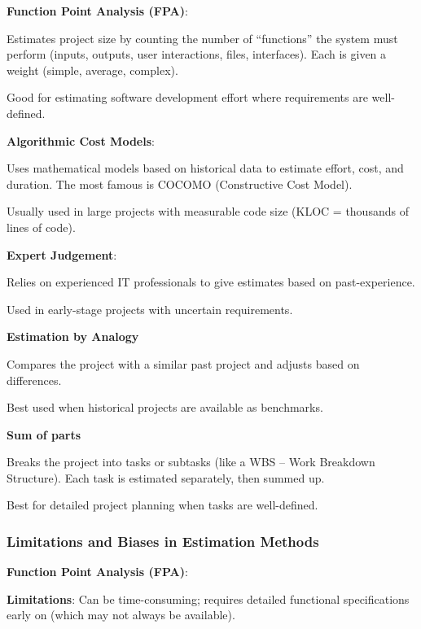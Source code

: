 \indent 

\noindent\textbf{Function Point Analysis (FPA)}:

Estimates project size by counting the number of “functions” the system must perform (inputs, outputs, user interactions, files, interfaces). Each is given a weight (simple, average, complex).

Good for estimating software development effort where requirements are well-defined.

\bigskip

\noindent\textbf{Algorithmic Cost Models}:

Uses mathematical models based on historical data to estimate effort, cost, and duration. The most famous is COCOMO (Constructive Cost Model).

Usually used in large projects with measurable code size (KLOC = thousands of lines of code).

\bigskip

\noindent\textbf{Expert Judgement}: 

Relies on experienced IT professionals to give estimates based on past-experience.

Used in early-stage projects with uncertain requirements.

\bigskip

\noindent\textbf{Estimation by Analogy}

Compares the project with a similar past project and adjusts based on differences.

Best used when historical projects are available as benchmarks.

\bigskip

\noindent\textbf{Sum of parts}

Breaks the project into tasks or subtasks (like a WBS – Work Breakdown Structure). Each task is estimated separately, then summed up.

Best for detailed project planning when tasks are well-defined.

\subsubsection{Limitations and Biases in Estimation Methods}

\indent 

\noindent\textbf{Function Point Analysis (FPA)}:

\textbf{Limitations}: Can be time-consuming; requires detailed functional specifications early on (which may not always be available).

